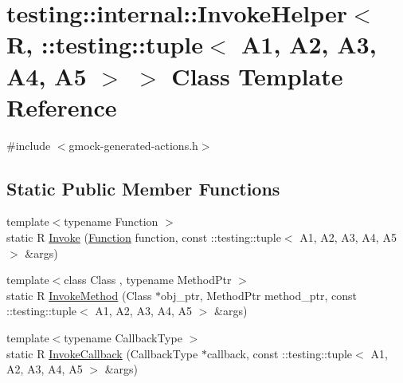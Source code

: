 \hypertarget{classtesting_1_1internal_1_1InvokeHelper_3_01R_00_01_1_1testing_1_1tuple_3_01A1_00_01A2_00_01A3_00_01A4_00_01A5_01_4_01_4}{}\section{testing\+::internal\+::Invoke\+Helper$<$ R, \+::testing\+::tuple$<$ A1, A2, A3, A4, A5 $>$ $>$ Class Template Reference}
\label{classtesting_1_1internal_1_1InvokeHelper_3_01R_00_01_1_1testing_1_1tuple_3_01A1_00_01A2_00_01A3_00_01A4_00_01A5_01_4_01_4}


{\ttfamily \#include $<$gmock-\/generated-\/actions.\+h$>$}

\subsection*{Static Public Member Functions}
\begin{DoxyCompactItemize}
\item 
{\footnotesize template$<$typename Function $>$ }\\static R \mbox{\hyperlink{classtesting_1_1internal_1_1InvokeHelper_3_01R_00_01_1_1testing_1_1tuple_3_01A1_00_01A2_00_01A3_00_01A4_00_01A5_01_4_01_4_a1458b05a4c61bc51ae99f586c6d070b8}{Invoke}} (\mbox{\hyperlink{structtesting_1_1internal_1_1Function}{Function}} function, const \+::testing\+::tuple$<$ A1, A2, A3, A4, A5 $>$ \&args)
\item 
{\footnotesize template$<$class Class , typename Method\+Ptr $>$ }\\static R \mbox{\hyperlink{classtesting_1_1internal_1_1InvokeHelper_3_01R_00_01_1_1testing_1_1tuple_3_01A1_00_01A2_00_01A3_00_01A4_00_01A5_01_4_01_4_a5748d33ebff032886c73d88f4b511d87}{Invoke\+Method}} (Class $\ast$obj\+\_\+ptr, Method\+Ptr method\+\_\+ptr, const \+::testing\+::tuple$<$ A1, A2, A3, A4, A5 $>$ \&args)
\item 
{\footnotesize template$<$typename Callback\+Type $>$ }\\static R \mbox{\hyperlink{classtesting_1_1internal_1_1InvokeHelper_3_01R_00_01_1_1testing_1_1tuple_3_01A1_00_01A2_00_01A3_00_01A4_00_01A5_01_4_01_4_ae0ea7f85722865bf58a3c15e51512041}{Invoke\+Callback}} (Callback\+Type $\ast$callback, const \+::testing\+::tuple$<$ A1, A2, A3, A4, A5 $>$ \&args)
\end{DoxyCompactItemize}


